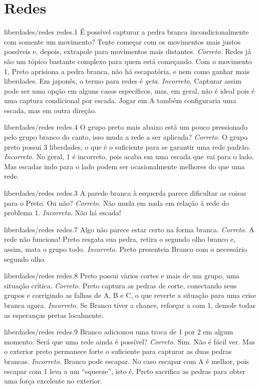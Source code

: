 \chapter{Redes}

\emptypage

\problemAnswerDiagram
  {liberdades/redes}
  {redes.1}
  {É possível capturar a pedra branca incondicionalmente com somente um movimento? Tente começar com os movimentos mais justos possíveis e, depois, extrapole para movimentos mais distantes.}
  {\emph{Correto.} Redes já são um tópico bastante complexo para quem está começando. Com o movimento 1, Preto aprisiona a pedra branca, não há escapatória, e nem como ganhar mais liberdades. Em japonês, o termo para redes é \emph{geta}.}
  {\emph{Incorreto.} Capturar assim pode ser uma opção em alguns casos específicos, mas, em geral, não é ideal pois é uma captura condicional por escada. Jogar em A também configuraria uma escada, mas em outra direção.}

\problemAnswerDiagram
  {liberdades/redes}
  {redes.4}
  {O grupo preto mais abaixo está um pouco pressionado pelo grupo branco do canto, isso muda a rede a ser aplicada?}
  {\emph{Correto.} O grupo preto possui 3 liberdades, o que é o suficiente para se garantir uma rede padrão.}
  {\emph{Incorreto.} No geral, 1 é incorreto, pois acaba em uma escada que vai para o lado. Mas escadas indo para o lado podem ser ocasionalmente melhores do que uma rede.}

\problemAnswerDiagram
  {liberdades/redes}
  {redes.3}
  {A parede branca à esquerda parece dificultar as coisas para o Preto. Ou não?}
  {\emph{Correto.} Não muda em nada em relação à rede do problema 1.}
  {\emph{Incorreto.} Não há escada!}

\problemAnswerDiagram
  {liberdades/redes}
  {redes.7}
  {Algo não parece estar certo na forma branca.}
  {\emph{Correto.} A rede não funciona! Preto resgata sua pedra, retira o segundo olho branco e, assim, mata o grupo todo.}
  {\emph{Incorreto.} Preto presenteia Branco com o necessário segundo olho.}

\problemAnswerDiagram
  {liberdades/redes}
  {redes.8}
  {Preto possui vários cortes e mais de um grupo, uma situação crítica.}
  {\emph{Correto.} Preto captura as pedras de corte, conectando seus grupos e corrigindo as falhas de A, B e C, o que reverte a situação para uma crise branca agora.}
  {\emph{Incorreto.} Se Branco tiver a chance, reforçar a com 1, demole todas as esperanças pretas localmente.}

\problemAnswerDiagram
  {liberdades/redes}
  {redes.9}
  {Branco adicionou uma troca de 1 por 2 em algum momento. Será que uma rede ainda é possível?}
  {\emph{Correto.} Sim. Não é fácil ver. Mas o exterior preto permanece forte o suficiente para capturar as duas pedras brancas.}
  {\emph{Incorreto.} Branco pode escapar. No caso escapar com A é melhor, pois escapar com 1 leva a um ``squeeze'', isto é, Preto sacrifica as pedras para obter uma força excelente no exterior.}
  
